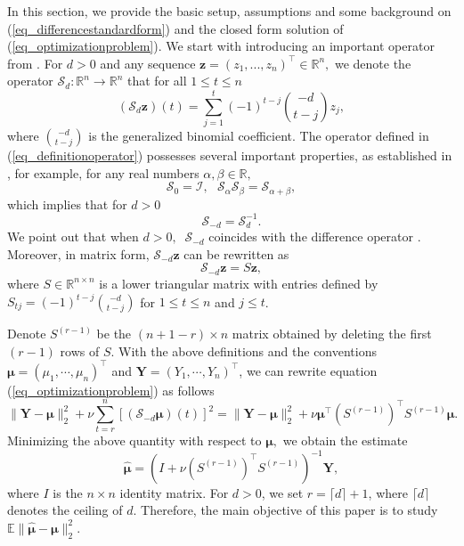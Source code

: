 \documentclass[11pt]{article}
\newcommand{\zb}{\mathbf{z}}
\newcommand{\calS}{\mathcal{S}}
\numberwithin{equation}{section}
\numberwithin{figure}{section}
\begin{document}
In this section, we provide the basic setup, assumptions and some background on (\ref{eq_differencestandardform}) and the closed form solution of (\ref{eq_optimizationproblem}). We start with introducing an important operator from \cite{BURMAN2006677}. For $d>0$ and any sequence $\zb=(z_{1},...,z_{n})^\top \in \mathbb{R}^n,$ we denote the operator $\calS_d: \mathbb{R}^n \rightarrow \mathbb{R}^n$ that for all $1 \leq t \leq n$  
\begin{equation}\label{eq_definitionoperator}
(\calS_{d}\zb)(t)=\sum_{j=1}^t (-1)^{t-j}\binom{-d}{t-j}z_{j},
\end{equation} 
where $\binom{-d}{t-j}$ is the generalized binomial coefficient. The operator defined in (\ref{eq_definitionoperator}) possesses several important properties, as established in \cite[Lemma 1]{BURMAN2006677}, for example, for any real numbers $\alpha, \beta \in \mathbb{R},$
\begin{equation}\label{eq_operatorproperty1}
\calS_0=\mathcal{I}, \ \ \ \calS_{\alpha} \calS_{\beta}=\calS_{\alpha+\beta},
\end{equation}  
which implies that for $d>0$
\begin{equation}\label{eq_operatorproperty2}
\calS_{-d}=\calS_d^{-1}. 
\end{equation}
We point out that when $d>0, \ $ $\calS_{-d}$  coincides with the  difference operator \cite{gray1988new}. Moreover, in matrix form, $\calS_{-d} \zb$ can be rewritten as
\begin{equation*}
\calS_{-d} \zb = S \zb,
\end{equation*}
where $S \in \mathbb{R}^{n \times n}$ is a lower triangular matrix with entries defined by $S_{tj} = (-1)^{t-j} \binom{-d}{t-j}$ for $1 \leq t \leq n$ and $j \leq t$. 

Denote $S^{(r-1)}$ be the $(n+1-r) \times n$ matrix obtained by deleting the first $(r-1)$ rows of $S.$ With the above definitions and the conventions $\bm{\mu} = (\mu_1, \cdots, \mu_n)^\top$ and $\bm{Y} = (Y_1, \cdots, Y_n)^\top$, we can rewrite equation (\ref{eq_optimizationproblem}) as follows
\begin{equation}\label{eq_miminizationreducedform}
\|\bm{Y}-\bm{\mu}\|_2^{2}+\nu\sum_{t=r}^n \left[(\calS_{-d}\bm{\mu})(t)\right]^{2}=\|\bm{Y}-\bm{\mu}\|_2^{2}+\nu \bm{\mu}^\top (S^{(r-1)})^\top S^{(r-1)} \bm{\mu}.
\end{equation}
Minimizing the above quantity with respect to $\bm{\mu},$ we obtain the estimate
\begin{equation}\label{eq_estimatefinal}
\widehat{\bm{\mu}}=(I+\nu (S^{(r-1)})^\top S^{(r-1)})^{-1} \bm{Y},
\end{equation}
where $I$ is the $n \times n$ identity matrix. For $d>0$, we set $r=\lceil d \rceil + 1$, where $\lceil d \rceil$ denotes the ceiling of $d$. Therefore, the main objective of this paper is to study $\mathbb{E}\|\widehat{\bm{\mu}} - \bm{\mu}\|_2^2$.
\end{document}
